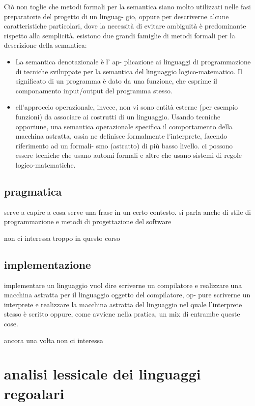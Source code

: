\documentclass[12pt]{article}
\begin{document}
Ciò non toglie che metodi formali per la
semantica siano molto utilizzati nelle fasi preparatorie del progetto di un linguag-
gio, oppure per descriverne alcune caratteristiche particolari, dove la necessità di
evitare ambiguità è predominante rispetto alla semplicità.
esistono due grandi famiglie di metodi formali per la descrizione della semantica:
\begin{itemize}
    \item La semantica denotazionale è l' ap-
plicazione ai linguaggi di programmazione di tecniche sviluppate per la semantica
del linguaggio logico-matematico. Il significato di un programma è dato da una
funzione, che esprime il componamento input/output del programma stesso.
\item ell'approccio operazionale, invece, non vi sono entità esterne (per esempio
funzioni) da associare ai costrutti di un linguaggio. Usando tecniche opportune,
una semantica operazionale specifica il comportamento della macchina astratta,
ossia ne definisce formalmente l'interprete, facendo riferimento ad un formali-
smo (astratto) di più basso livello. ci possono essere tecniche che usano automi formali e altre che usano sistemi di regole logico-matematiche.

\end{itemize}

\subsection{pragmatica}
serve a capire a cosa serve una frase in un certo contesto.
si parla anche di stile di programmazione e metodi di progettazione del software

non ci interessa troppo in questo corso

\subsection{implementazione}
implementare un linguaggio vuol dire scriverne un compilatore
e realizzare una macchina astratta per il linguaggio oggetto del compilatore, op-
pure scriverne un interprete e realizzare la macchina astratta del linguaggio nel
quale l'interprete stesso è scritto oppure, come avviene nella pratica, un mix di
entrambe queste cose.

ancora una volta non ci interessa

\section{analisi lessicale dei linguaggi regoalari}
\end{document}
